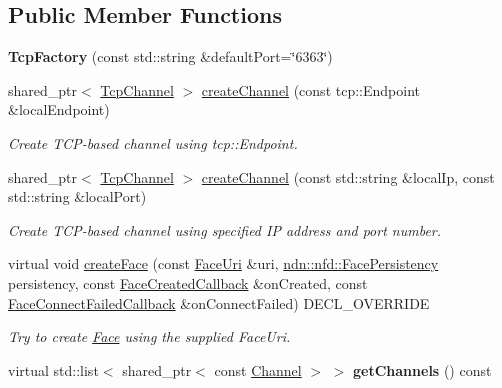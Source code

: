 \subsection*{Public Member Functions}
\begin{DoxyCompactItemize}
\item 
{\bfseries Tcp\+Factory} (const std\+::string \&default\+Port=\char`\"{}6363\char`\"{})\hypertarget{classnfd_1_1TcpFactory_a714355dce6deef7a76ed84e8c002a940}{}\label{classnfd_1_1TcpFactory_a714355dce6deef7a76ed84e8c002a940}

\item 
shared\+\_\+ptr$<$ \hyperlink{classnfd_1_1TcpChannel}{Tcp\+Channel} $>$ \hyperlink{classnfd_1_1TcpFactory_a0cf360603f5e7eaa783dfb54708ca8a6}{create\+Channel} (const tcp\+::\+Endpoint \&local\+Endpoint)
\begin{DoxyCompactList}\small\item\em Create T\+C\+P-\/based channel using tcp\+::\+Endpoint. \end{DoxyCompactList}\item 
shared\+\_\+ptr$<$ \hyperlink{classnfd_1_1TcpChannel}{Tcp\+Channel} $>$ \hyperlink{classnfd_1_1TcpFactory_ad889634e6d883f56467efd4eb5ce2067}{create\+Channel} (const std\+::string \&local\+Ip, const std\+::string \&local\+Port)
\begin{DoxyCompactList}\small\item\em Create T\+C\+P-\/based channel using specified IP address and port number. \end{DoxyCompactList}\item 
virtual void \hyperlink{classnfd_1_1TcpFactory_adae42421216ea295e35ef9177d0fe95f}{create\+Face} (const \hyperlink{classndn_1_1util_1_1FaceUri}{Face\+Uri} \&uri, \hyperlink{group__management_ga05df4b7c484a0fae25d3e65962511bac}{ndn\+::nfd\+::\+Face\+Persistency} persistency, const \hyperlink{namespacenfd_a6d4b91580c829552a452c53458381b0f}{Face\+Created\+Callback} \&on\+Created, const \hyperlink{namespacenfd_ae87d4f07de26f4939691439b51f2dd83}{Face\+Connect\+Failed\+Callback} \&on\+Connect\+Failed) D\+E\+C\+L\+\_\+\+O\+V\+E\+R\+R\+I\+DE
\begin{DoxyCompactList}\small\item\em Try to create \hyperlink{classnfd_1_1Face}{Face} using the supplied Face\+Uri. \end{DoxyCompactList}\item 
virtual std\+::list$<$ shared\+\_\+ptr$<$ const \hyperlink{classnfd_1_1Channel}{Channel} $>$ $>$ {\bfseries get\+Channels} () const\hypertarget{classnfd_1_1TcpFactory_aa9cbd49415ee572ae069246ae783c6fe}{}\label{classnfd_1_1TcpFactory_aa9cbd49415ee572ae069246ae783c6fe}


\end{DoxyCompactItemize}
